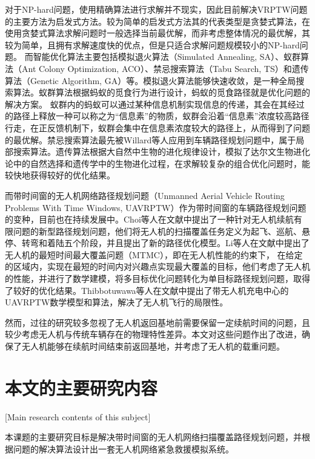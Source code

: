 对于NP-hard问题，使用精确算法进行求解并不现实，因此目前解决VRPTW问题的主要方法为启发式方法。较为简单的启发式方法其的代表类型是贪婪式算法，在使用贪婪式算法求解问题时一般选择当前最优解，而非考虑整体情况的最优解，其较为简单，且拥有求解速度快的优点，但是只适合求解问题规模较小的NP-hard问题。
而智能优化算法主要包括模拟退火算法（Simulated Annealing, SA）、蚁群算法（Ant Colony Optimization, ACO）、禁忌搜索算法（Tabu Search, TS）和遗传算法（Genetic Algorithm, GA）等。模拟退火算法能够快速收敛，是一种全局搜索算法\cite{lee2021simulated}。蚁群算法根据蚂蚁的觅食行为进行设计，蚂蚁的觅食路径就是优化问题的解决方案。
蚁群内的蚂蚁可以通过某种信息机制实现信息的传递，其会在其经过的路径上释放一种可以称之为“信息素”的物质，蚁群会沿着“信息素”浓度较高路径行走，在正反馈机制下，蚁群会集中在信息素浓度较大的路径上，从而得到了问题的最优解\cite{wu2021hybrid}。禁忌搜索算法最先被Willard等人应用到车辆路径规划问题中\cite{ilhan2021improved}，属于局部搜索算法。遗传算法根据大自然中生物的进化规律设计，模拟了达尔文生物进化论中的自然选择和遗传学中的生物进化过程，在求解较复杂的组合优化问题时，能较快地获得较好的优化结果。


而带时间窗的无人机网络路径规划问题（Unmanned Aerial Vehicle Routing Problems With Time Windows, UAVRPTW）作为带时间窗的车辆路径规划问题的变种，目前也在持续发展中。Choi等人在文献中提出了一种针对无人机续航有限问题的新型路径规划问题，他们将无人机的扫描覆盖任务定义为起飞、巡航、悬停、转弯和着陆五个阶段，并且提出了新的路径优化模型\cite{2019Energy}。Li等人在文献中提出了无人机的最短时间最大覆盖问题（MTMC），即在无人机性能的约束下，
在给定的区域内，实现在最短的时间内对兴趣点实现最大覆盖的目标，他们考虑了无人机的性能，并进行了数学建模，将多目标优化问题转化为单目标路径规划问题，取得了较好的优化结果\cite{2020A}。Thibbotuwawa等人在文献中提出了带无人机充电中心的UAVRPTW数学模型和算法，解决了无人机飞行的局限性\cite{thibbotuwawa2020unmanned}。


然而，过往的研究较多忽视了无人机返回基地前需要保留一定续航时间的问题，且较少考虑无人机与传统车辆存在的物理特性差异。本文对这些问题作出了改进，确保了无人机能够在续航时间结束前返回基地，并考虑了无人机的载重问题。
\section{本文的主要研究内容}[Main research contents of this subject]

本课题的主要研究目标是解决带时间窗的无人机网络扫描覆盖路径规划问题，并根据问题的解决算法设计出一套无人机网络紧急救援模拟系统。

